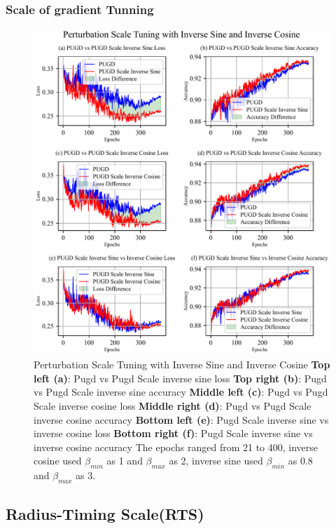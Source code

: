 \documentclass[10pt,twocolumn,letterpaper]{article}
\begin{document}
\subsubsection{Scale of gradient Tunning}
\label{subsec:4.1.3}

\begin{figure}[htbp]
	\center
	\vspace{-10pt} 
	\includegraphics[width=\columnwidth]{images/PUGDScaleInv.pdf}
	\caption{Perturbation Scale Tuning with Inverse Sine and Inverse Cosine
	\textbf{Top left (a)}: Pugd vs Pugd Scale inverse sine loss \textbf{Top right (b)}: Pugd vs Pugd Scale inverse sine accuracy
    \textbf{Middle left (c)}: Pugd vs Pugd Scale inverse cosine loss \textbf{Middle right (d)}: Pugd vs Pugd Scale inverse cosine accuracy
	\textbf{Bottom left (e)}: Pugd Scale inverse sine vs inverse cosine loss \textbf{Bottom right (f)}: Pugd Scale inverse sine vs inverse cosine accuracy
	The epochs ranged from 21 to 400, inverse cosine used $\beta_{min}$ as 1 and $\beta_{max}$ as 2, inverse sine used $\beta_{min}$ as 0.8 and $\beta_{max}$ as 3.
	}
	\label{fig:PUGDScaleInv}
\end{figure}




\subsection{Radius-Timing Scale(RTS)}
\label{subsec:4.2}
\end{document}
